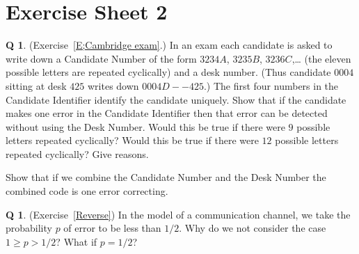 \documentclass[12pt,a4paper]{article}
\theoremstyle{plain}
\theoremstyle{definition}
\newtheorem{question}[theorem]{Q}
\begin{document}
    \section{Exercise Sheet 2}
    \begin{question}
        \label{C2.1}(Exercise~\ref{E;Cambridge exam}.)
        In an exam
        each candidate is asked to write down a Candidate Number of the
        form $3234A$, $3235B$, $3236C$,\dots
        (the eleven possible letters are repeated cyclically)
        and a desk number. (Thus candidate $0004$ sitting at desk $425$
        writes down $0004D--425$.)
        The first four numbers
        in the Candidate Identifier identify the candidate
        uniquely.
        Show that if the candidate makes one error
        in the Candidate Identifier
        then that error can be detected
        without using the Desk Number.
        Would this be true if there were $9$ possible
        letters repeated cyclically? Would this be true
        if there were $12$ possible
        letters repeated cyclically?
        Give reasons.

        Show that if we combine the Candidate Number and
        the Desk Number the combined code is one error correcting.
    \end{question}
    \begin{question}
        \label{C2.2}
        (Exercise~\ref{Reverse}) In the model of a communication
        channel, we take the probability $p$ of error
        to be less than $1/2$.
        Why do we not consider
        the case $1\geq p>1/2$? What
        if $p=1/2$?
    \end{question}
\end{document}
